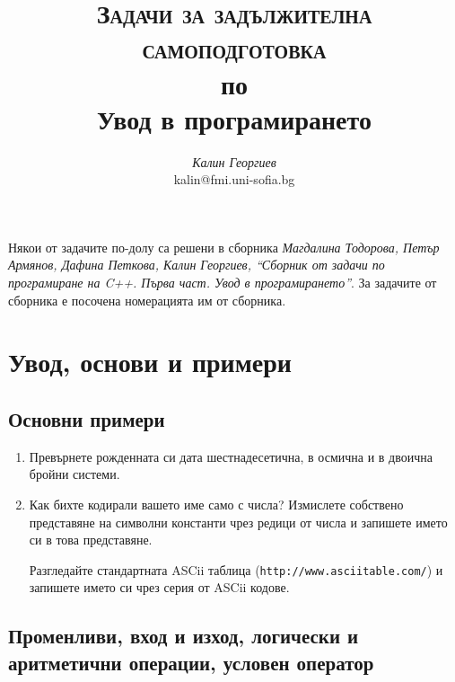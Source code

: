\documentclass[12pt,a4paper]{article}
\author{\textit{Калин Георгиев}\\
\small{kalin@fmi.uni-sofia.bg}}
\title{\textsc{Задачи за задължителна самоподготовка} \\
по \\
Увод в програмирането}
\newcommand{\code}[1]{\texttt{#1}}
\begin{document}
\maketitle

\tableofcontents

\pagebreak

\small{Някои от задачите по-долу са решени в сборника \cite{sbornik}\textit{Магдалина Тодорова, Петър Армянов, Дафина Петкова, Калин Георгиев, ``Сборник от задачи по програмиране на C++. Първа част. Увод в програмирането''}. За задачите от сборника е посочена номерацията им от сборника.}

\pagebreak


\section {Увод, основи и примери}

\subsection {Основни примери}

\begin{enumerate}

	\item Превърнете рожденната си дата шестнадесетична, в осмична и в двоична бройни системи.

	\item Как бихте кодирали вашето име само с числа? Измислете собствено представяне на символни константи чрез редици от числа и запишете името си в това представяне.

	Разгледайте стандартната ASCii таблица (\code{http://www.asciitable.com/}) и запишете името си чрез серия от ASCii кодове.

\end{enumerate}

\subsection {Променливи, вход и изход, логически и аритметични операции, условен оператор}
\end{document}
